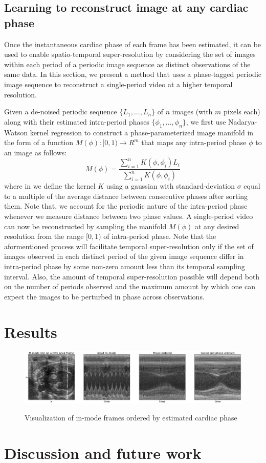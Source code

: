 \documentclass[runningheads,a4paper]{llncs}
\newcounter{lfigcounter}
\newenvironment{IonFigT}{\setcounter{lfigcounter}{1}\begin{figure}[!t]}{\end{figure}}
\def\ionbox#1{\makebox[#1]{(\alph{lfigcounter})}\stepcounter{lfigcounter}}
\begin{document}
\subsection{Learning to reconstruct image at any cardiac phase}
\label{sec:method:super_resolution}
%
Once the instantaneous cardiac phase of each frame has been estimated, it can be used to enable spatio-temporal super-resolution by considering the set of images within each period of a periodic image sequence as distinct observations of the same data. In this section, we present a method that uses a phase-tagged periodic image sequence to reconstruct a single-period video at a higher temporal resolution. 
	
Given a de-noised periodic sequence $\{L_1, ..., L_n\}$ of $n$ images (with $m$ pixels each) along with their estimated intra-period phases $\{\phi_1, ..., \phi_n\}$, we first use Nadarya-Watson kernel regression\cite{Bishop2006} to construct a phase-parameterized image manifold in the form of a function $M(\phi): [0, 1) \to R^m $ that maps any intra-period phase $\phi$ to an image as follows:
\begin{equation}
M(\phi) = \frac{\sum_{i = 1}^{n} K(\phi, \phi_i) L_i}{\sum_{i = 1}^{n} K(\phi, \phi_i)} 
\end{equation}
where in we define the kernel $K$ using a gaussian with standard-deviation $\sigma$ equal to a multiple of the average distance between consecutive phases after sorting them. Note that, we account for the periodic nature of the intra-period phase whenever we measure distance between two phase values. A single-period video can now be reconstructed by sampling the manifold $M(\phi)$ at any desired resolution from the range $[0, 1)$ of intra-period phase. Note that the aformentioned process will facilitate temporal super-resolution only if the set of images observed in each distinct period of the given image sequence differ in intra-period phase by some non-zero amount less than its temporal sampling interval. Also, the amount of temporal super-resolution possible will depend both on the number of periods observed and the maximum amount by which one can expect the images to be perturbed in phase across observations. 
\section{Results}
\label{sec:results}
%
%
\begin{IonFigT}
\centering
%
\includegraphics[width=5.0in]{figures/decoded/2015-07-27-10-36-06_2015-07-15-16-56-16_1.raw.bmode/phaseordered.png}
\ionbox{5.0in}\\
%
\caption{Visualization of m-mode frames ordered by estimated cardiac phase}
\label{fig:phase_ordering}
\end{IonFigT}
%
%
\section{Discussion and future work}
\label{sec:discussion}
%


%


\end{document}
